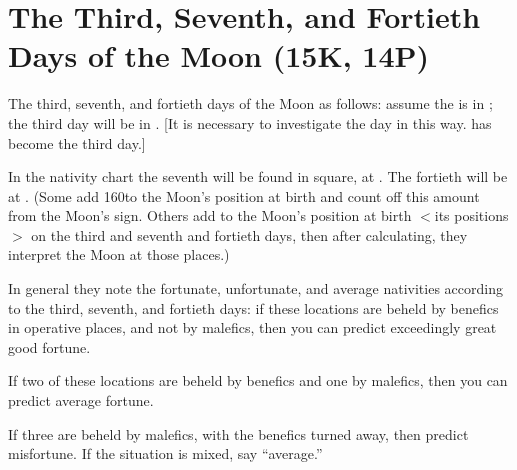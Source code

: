 \section{The Third, Seventh, and Fortieth Days of the Moon (15K, 14P)}

The third, seventh, and fortieth days of the Moon as follows: assume the \Moon\xspace is in \deg; the third day will be in \Sagittarius\xspace 7\deg. [It is necessary to investigate the day in this way. \Sagittarius\xspace 7\deg\xspace has
become the third day.] 

In the nativity chart the seventh will be found in square, at \Aquarius\xspace 7\deg. The fortieth will be at \Taurus\xspace 7\deg. (Some add 160\deg to the Moon’s position at birth and count off this amount from the Moon’s sign. Others add to the Moon’s position at birth $<$its positions$>$ on the third and seventh
and fortieth days, then after calculating, they interpret the Moon at those places.)

\mndl[0.2cm]
In general they note the fortunate, unfortunate, and average nativities according to the third, seventh, and fortieth days: if these locations are beheld by benefics in operative places, and not by malefics, then you can predict exceedingly great good fortune. 

If two of these locations are beheld by benefics and one by malefics, then you can predict average fortune. 

If three are beheld by malefics, with the benefics turned
away, then predict misfortune. If the situation is mixed, say “average.”

\newpage